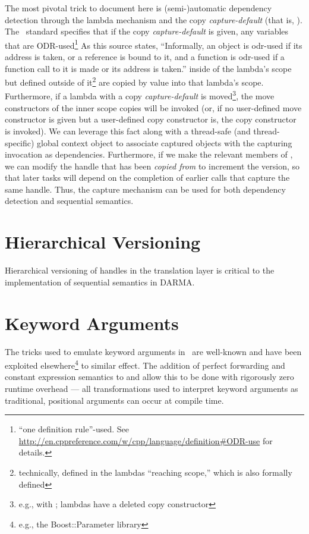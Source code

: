 The most pivotal trick to document here is (semi-)automatic dependency detection
through the  lambda mechanism and the copy {\it capture-default} (that is,
\inlinecode{[=]}).  The \CC\ standard specifies that if the copy
{\it capture-default} is given, any variables that are ODR-used\footnote{``one
definition rule''-used.  See
\url{http://en.cppreference.com/w/cpp/language/definition\#ODR-use} for
details.} 
As this source states, ``Informally, an object is odr-used if its address is
taken, or a reference is bound to it, and a function is odr-used if a function
call to it is made or its address is taken.'' inside of the lambda's scope but
defined outside of it\footnote{technically, defined in the lambdas
``reaching scope,'' which is also formally defined} are copied by value into
that lambda's scope.  Furthermore, if a lambda with a copy {\it capture-default}
is moved\footnote{e.g., with ; lambdas have a deleted
copy constructor}, the move constructors of the inner scope copies will be
invoked (or, if no user-defined move constructor is given but a user-defined
copy constructor is, the copy constructor is invoked).  We can leverage this
fact along with a thread-safe (and thread-specific) global context object to
associate captured  objects with the capturing
 invocation as dependencies.  Furthermore, if we
make the relevant members of  ,
we can modify the handle that has been {\it copied from} to increment the
version, so that later tasks will depend on the completion of earlier
 calls that capture the same handle.  Thus, the capture
mechanism can be used for both dependency detection and sequential semantics.

\section{Hierarchical Versioning}

Hierarchical versioning of handles in the translation layer is critical to the
implementation of sequential semantics in DARMA. 

\section{Keyword Arguments}
\label{sec:kwargs}

The tricks used to emulate keyword arguments in \CC\ are well-known and have been
exploited elsewhere\footnote{e.g., the Boost::Parameter library} to similar
effect.  The addition of perfect forwarding and constant expression semantics to
 and  allow this to be done with rigorously zero runtime overhead ---
all transformations used to interpret keyword arguments as traditional,
positional arguments can occur at compile time.
